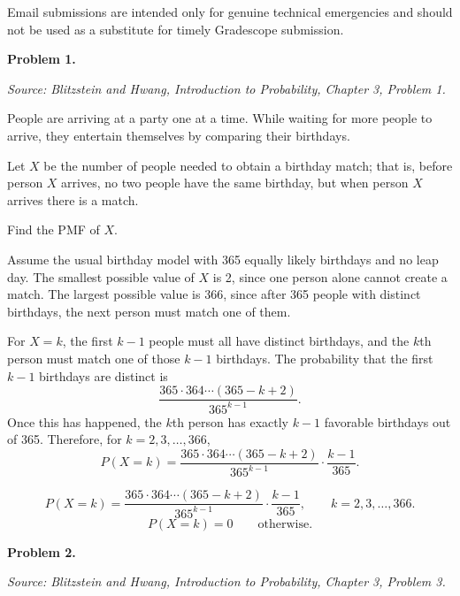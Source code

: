 \documentclass[11pt]{article}
\newcommand{\source}[1]{%
    \vspace{0.15cm}
    {\small\textit{Source: Blitzstein and Hwang, \textit{Introduction to Probability}, Chapter 3, Problem #1.}}
}
\begin{document}
Email submissions are intended only for genuine technical emergencies and should not be used as a substitute for timely Gradescope submission.

\newpage


\begin{problemheader}
\textbf{Problem 1. }
\end{problemheader}
\source{1}

People are arriving at a party one at a time. While waiting for more people to arrive, they entertain themselves by comparing their birthdays.

Let $X$ be the number of people needed to obtain a birthday match; that is, before person $X$ arrives, no two people have the same birthday, but when person $X$ arrives there is a match.

Find the PMF of $X$.

\begin{solutionbox}
Assume the usual birthday model with 365 equally likely birthdays and no leap day. The smallest possible value of $X$ is 2, since one person alone cannot create a match. The largest possible value is 366, since after 365 people with distinct birthdays, the next person must match one of them.

For $X=k$, the first $k-1$ people must all have distinct birthdays, and the $k$th person must match one of those $k-1$ birthdays. The probability that the first $k-1$ birthdays are distinct is
\[
\frac{365\cdot 364\cdots (365-k+2)}{365^{k-1}}.
\]
Once this has happened, the $k$th person has exactly $k-1$ favorable birthdays out of 365. Therefore, for $k=2,3,\ldots,366$,
\[
P(X=k)
=
\frac{365\cdot 364\cdots (365-k+2)}{365^{k-1}}\cdot \frac{k-1}{365}.
\]

 

\begin{finalanswerbox}
\[
P(X=k)=\frac{365\cdot 364\cdots (365-k+2)}{365^{k-1}}\cdot \frac{k-1}{365},
\qquad k=2,3,\ldots,366.
\]
\[
P(X=k)=0 \qquad \text{otherwise.}
\]
\end{finalanswerbox}
\end{solutionbox}
\newpage


\begin{problemheader}
\textbf{Problem 2. }
\end{problemheader}
\source{3}
\end{document}
